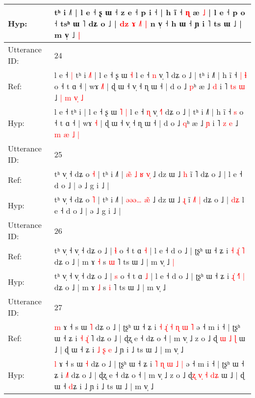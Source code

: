 \documentclass[10pt]{article}
\DeclareRobustCommand{\hl}[1]{{\textcolor{red}{#1}}}
\begin{document}
\begin{longtable}{ll}
 \\
Hyp: & tʰ i ˩˥ | l e ˧ ʂ ɯ ˧ z e ˧ p i ˧ | h ĩ\hl{}\hl{}\hl{}\hl{}\hl{}\hl{}\hl{}\hl{} ˧ \hl{ɳ} \hl{}æ \hl{˩} | l e ˧ p o ˧ tsʰ ɯ \hl{}˥\hl{}\hl{} dʑ o ˩ |\hl{ }\hl{d}\hl{z} \hl{ɤ} \hl{˩}\hl{˥} \hl{|} n v̩ ˧ h ɯ ˧ ɲ i ˥ ts ɯ ˩ | m v̩ ˩\hl{ }\hl{|}
 \\
\midrule
Utterance ID: & 24 \\
Ref: & l e ˧\hl{ }\hl{|} tʰ i\hl{ }\hl{˩}\hl{˥} | l e ˧ ʂ ɯ\hl{}\hl{} \hl{˧} l e ˧ \hl{n} v̩ \hl{}˥ dʑ o ˩ | tʰ i ˩˥ | h ĩ ˧\hl{ }\hl{|} \hl{ɬ} o ˧ t ɑ ˧ | wɤ \hl{˩}\hl{˥} | ɖ ɯ ˧ v̩ ˧ ɳ ɯ ˧ | d o ˩ \hl{p}ʰ æ ˩ \hl{d} i ˥ \hl{t}\hl{s} \hl{ɯ} ˩ \hl{|} \hl{m} \hl{v}\hl{̩} \hl{˩}
 \\
Hyp: & l e ˧\hl{}\hl{} tʰ i\hl{}\hl{}\hl{} | l e ˧ ʂ ɯ\hl{ }\hl{˥} \hl{|} l e ˧ \hl{ɳ} v̩ \hl{˧}˥ dʑ o ˩ | tʰ i ˩˥ | h ĩ ˧\hl{}\hl{} \hl{s} o ˧ t ɑ ˧ | wɤ \hl{}\hl{˧} | ɖ ɯ ˧ v̩ ˧ ɳ ɯ ˧ | d o ˩ \hl{q}ʰ æ ˩ \hl{ɲ} i ˥ \hl{}\hl{z} \hl{e} ˩ \hl{m} \hl{æ} \hl{}\hl{˩} \hl{|}
 \\
\midrule
Utterance ID: & 25 \\
Ref: & tʰ v̩ ˧ dʑ o \hl{˧} | tʰ i ˩˥ | \hl{æ}\hl{̃}\hl{ }\hl{˩}\hl{ }\hl{ʁ} \hl{v}\hl{̩} ˩ dz ɯ ˩ \hl{h} ĩ \hl{}˥\hl{}\hl{} dʑ o ˩ |\hl{}\hl{}\hl{} l e ˧ d o ˩ | ə ˩ g i ˩ |
 \\
Hyp: & tʰ v̩ ˧ dʑ o \hl{˥} | tʰ i ˩˥ | \hl{}\hl{}\hl{ə}\hl{ə}\hl{ə}\hl{…} \hl{æ}\hl{̃} ˩ dz ɯ ˩ \hl{ɻ} ĩ \hl{˩}˥\hl{ }\hl{|} dʑ o ˩ |\hl{ }\hl{d}\hl{ʑ} l e ˧ d o ˩ | ə ˩ g i ˩ |
 \\
\midrule
Utterance ID: & 26 \\
Ref: & tʰ v̩ ˧ v̩ ˧ dʑ o ˩ | \hl{ɬ} o ˧ t ɑ \hl{˧} | l e ˧ d o ˩ | ʈʂʰ ɯ ˧ ʑ i \hl{}\hl{˧} \hl{ɻ}\hl{̍} \hl{˥} dʑ o ˩ | m ɤ \hl{˧} s \hl{ɯ} ˥ ts ɯ ˩ | m v̩ ˩\hl{ }\hl{|}
 \\
Hyp: & tʰ v̩ ˧ v̩ ˧ dʑ o ˩ | \hl{s} o ˧ t ɑ \hl{˩} | l e ˧ d o ˩ | ʈʂʰ ɯ ˧ ʑ i \hl{ɻ}\hl{̍} \hl{˧}\hl{˥} \hl{|} dʑ o ˩ | m ɤ \hl{˩} s \hl{i} ˥ ts ɯ ˩ | m v̩ ˩\hl{}\hl{}
 \\
\midrule
Utterance ID: & 27 \\
Ref: & \hl{m} ɤ ˧ s ɯ \hl{˥} dʑ o ˩ | ʈʂʰ ɯ ˧ ʑ i\hl{ }\hl{˧} \hl{ɻ}\hl{̍} \hl{˧} \hl{ɳ} \hl{ɯ} \hl{˥} ə ˧ m i ˧ | ʈʂʰ ɯ ˧ ʑ i\hl{ }\hl{˧} \hl{ɻ}\hl{̍}\hl{ }˥ dʑ o ˩ | ɖʐ e ˧ dʑ o ˧ | m v̩ ˩ z o ˩ ɖ\hl{} \hl{}\hl{ɯ} \hl{˩} \hl{}\hl{ɭ} ɯ ˩ | ɖ ɯ ˧ \hl{}ʑ i\hl{ }\hl{˩}\hl{ }\hl{ʂ}\hl{ }\hl{e} ˩ ɲ i ˩ ts ɯ ˩ | m v̩ ˩
 \\
Hyp: & \hl{l} ɤ ˧ s ɯ \hl{˧} dʑ o ˩ | ʈʂʰ ɯ ˧ ʑ i\hl{}\hl{} \hl{}\hl{˥} \hl{ɳ} \hl{ɯ} \hl{˩} \hl{|} ə ˧ m i ˧ | ʈʂʰ ɯ ˧ ʑ i\hl{}\hl{} \hl{}\hl{}\hl{˩}˥ dʑ o ˩ | ɖʐ e ˧ dʑ o ˧ | m v̩ ˩ z o ˩ ɖ\hl{ʐ} \hl{v}\hl{̩} \hl{˧} \hl{d}\hl{ʑ} ɯ ˩ | ɖ ɯ ˧ \hl{d}ʑ i\hl{}\hl{}\hl{}\hl{}\hl{}\hl{} ˩ ɲ i ˩ ts ɯ ˩ | m v̩ ˩

\end{longtable}
\end{document}
